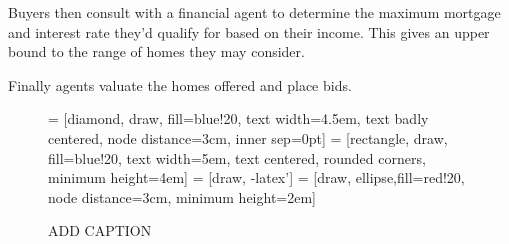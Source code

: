 Buyers then consult with a financial agent to determine the maximum mortgage and interest rate they'd qualify for based on their income. This gives an upper bound to the range of homes they may consider. 

Finally agents valuate the homes offered and place bids. %

%
%
%

\begin{figure}[htb]
    \begin{center}
  = [diamond, draw, fill=blue!20, 
     text width=4.5em, text badly centered, node distance=3cm, inner sep=0pt]
  = [rectangle, draw, fill=blue!20, 
     text width=5em, text centered, rounded corners, minimum height=4em]
  = [draw, -latex']
  = [draw, ellipse,fill=red!20, node distance=3cm,
     minimum height=2em]
%
 \begin{center}
 \end{center}
    \caption{ADD CAPTION}
    \label{fig-code-worker-choice}
    \end{center}
\end{figure}

